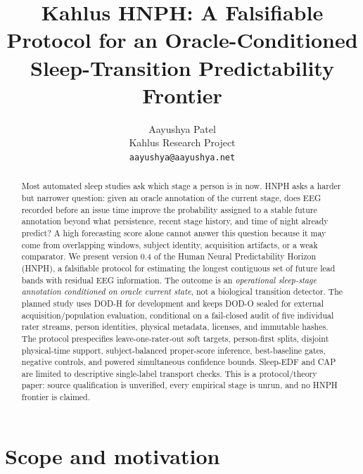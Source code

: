 \documentclass{article}
\title{Kahlus HNPH: A Falsifiable Protocol for an Oracle-Conditioned\\Sleep-Transition Predictability Frontier}
\author{%
  Aayushya Patel \\
  Kahlus Research Project \\
  \texttt{aayushya@aayushya.net}
}
\begin{document}
\maketitle

\begin{abstract}
Most automated sleep studies ask which stage a person is in now. HNPH asks a harder but narrower question: given an oracle annotation of the current stage, does EEG recorded before an issue time improve the probability assigned to a stable future annotation beyond what persistence, recent stage history, and time of night already predict? A high forecasting score alone cannot answer this question because it may come from overlapping windows, subject identity, acquisition artifacts, or a weak comparator. We present version 0.4 of the Human Neural Predictability Horizon (HNPH), a falsifiable protocol for estimating the longest contiguous set of future lead bands with residual EEG information. The outcome is an \emph{operational sleep-stage annotation conditioned on oracle current state}, not a biological transition detector. The planned study uses DOD-H for development and keeps DOD-O sealed for external acquisition/population evaluation, conditional on a fail-closed audit of five individual rater streams, person identities, physical metadata, licenses, and immutable hashes. The protocol prespecifies leave-one-rater-out soft targets, person-first splits, disjoint physical-time support, subject-balanced proper-score inference, best-baseline gates, negative controls, and powered simultaneous confidence bounds. Sleep-EDF and CAP are limited to descriptive single-label transport checks. This is a protocol/theory paper: source qualification is unverified, every empirical stage is unrun, and no HNPH frontier is claimed.
\end{abstract}

\begin{center}
\end{center}

\section{Scope and motivation}
\end{document}
